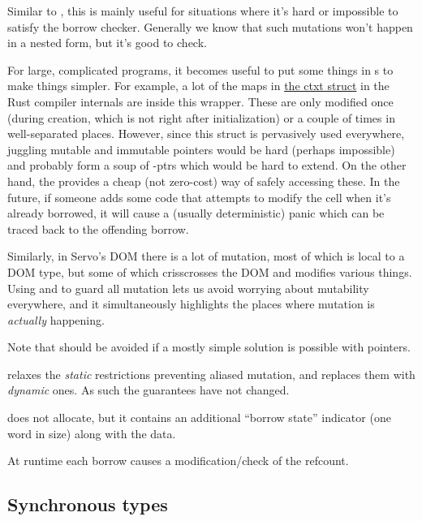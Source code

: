 Similar to , this is mainly useful for situations where it's hard or impossible to satisfy the borrow checker. 
Generally we know that such mutations won't happen in a nested form, but it's good to check.

\blank

For large, complicated programs, it becomes useful to put some things in s to make things simpler. For example, 
a lot of the maps in \href{https://doc.rust-lang.org/rustc/middle/ty/struct.ctxt.html}{the ctxt struct} in the Rust compiler 
internals are inside this wrapper. These are only modified once (during creation, which is not right after initialization) or 
a couple of times in well-separated places. However, since this struct is pervasively used everywhere, juggling mutable and 
immutable pointers would be hard (perhaps impossible) and probably form a soup of \code{\&}-ptrs which would be hard to extend. 
On the other hand, the  provides a cheap (not zero-cost) way of safely accessing these. In the future, if someone 
adds some code that attempts to modify the cell when it's already borrowed, it will cause a (usually deterministic) panic which 
can be traced back to the offending borrow.

\blank

Similarly, in Servo's DOM there is a lot of mutation, most of which is local to a DOM type, but some of which crisscrosses 
the DOM and modifies various things. Using  and  to guard all mutation lets us avoid worrying 
about mutability everywhere, and it simultaneously highlights the places where mutation is \emph{actually} happening.

\blank

Note that  should be avoided if a mostly simple solution is possible with \code{\&} pointers.


 relaxes the \emph{static} restrictions preventing aliased mutation, and replaces them with \emph{dynamic} 
ones. As such the guarantees have not changed.


 does not allocate, but it contains an additional \enquote{borrow state} indicator (one word in size) 
along with the data.

\blank

At runtime each borrow causes a modification/check of the refcount.

\subsection*{Synchronous types}

